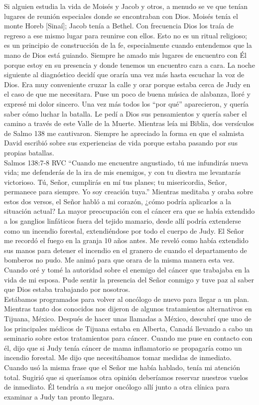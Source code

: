 \documentclass[twoside, 12pt]{book}
\begin{document}
Si alguien estudia la vida de Moisés y Jacob y otros, a menudo se ve que tenían lugares de reunión especiales donde se encontraban con Dios. Moisés tenía el monte Horeb [Sinaí]; Jacob tenía a Bethel. Con frecuencia Dios los traía de regreso a ese mismo lugar para reunirse con ellos. Esto no es un ritual religioso; es un principio de construcción de la fe, especialmente cuando entendemos que la mano de Dios está guiando. Siempre he amado mis lugares de encuentro con Él porque estoy en su presencia y donde tenemos un encuentro cara a cara.
La noche siguiente al diagnóstico decidí que oraría una vez más hasta escuchar la voz de Dios. Era muy conveniente cruzar la calle y orar porque estaba cerca de Judy en el caso de que me necesitara. Puse un poco de buena música de alabanza, lloré y expresé mi dolor sincero. Una vez más todos los “por qué” aparecieron, y quería saber cómo luchar la batalla. Le pedí a Dios sus pensamientos y quería saber el camino a través de este Valle de la Muerte. Mientras leía mi Biblia, dos versículos de Salmo 138 me cautivaron. Siempre he apreciado la forma en que el salmista David escribió sobre sus experiencias de vida porque estaba pasando por sus propias batallas.\\

Salmos 138:7-8 RVC “Cuando me encuentre angustiado, tú me infundirás nueva vida; me defenderás de la ira de mis enemigos, y con tu diestra me levantarás victorioso. Tú, Señor, cumplirás en mí tus planes; tu misericordia, Señor, permanece para siempre. Yo soy creación tuya.”
Mientras meditaba y oraba sobre estos dos versos, el Señor habló a mi corazón, ¿cómo podría aplicarlos a la situación actual? La mayor preocupación con el cáncer era que se había extendido a los ganglios linfáticos fuera del tejido mamario, desde allí podría extenderse como un incendio forestal, extendiéndose por todo el cuerpo de Judy. El Señor me recordó el fuego en la granja 10 años antes. Me reveló como había extendido sus manos para detener el incendio en el granero de cuando el departamento de bomberos no pudo. Me animó para que orara de la misma manera esta vez. Cuando oré y tomé la autoridad sobre el enemigo del cáncer que trabajaba en la vida de mi esposa. Pude sentir la presencia del Señor conmigo y tuve paz al saber que Dios estaba trabajando por nosotros.\\

Estábamos programados para volver al oncólogo de nuevo para llegar a un plan. Mientras tanto dos conocidos nos dijeron de algunos tratamientos alternativos en Tijuana, México. Después de hacer unas llamadas a México, descubrí que uno de los principales médicos de Tijuana estaba en Alberta, Canadá llevando a cabo un seminario sobre estos tratamientos para cáncer. Cuando me puse en contacto con él, dijo que si Judy tenía cáncer de mama inflamatorio se propagaría como un incendio forestal. Me dijo que necesitábamos tomar medidas de inmediato. Cuando usó la misma frase que el Señor me había hablado, tenía mi atención total.  Sugirió que si queríamos otra opinión deberíamos reservar nuestros vuelos de inmediato. Él tendría a su mejor oncólogo allí junto a otra clínica para examinar a Judy tan pronto llegara.\\
\end{document}
